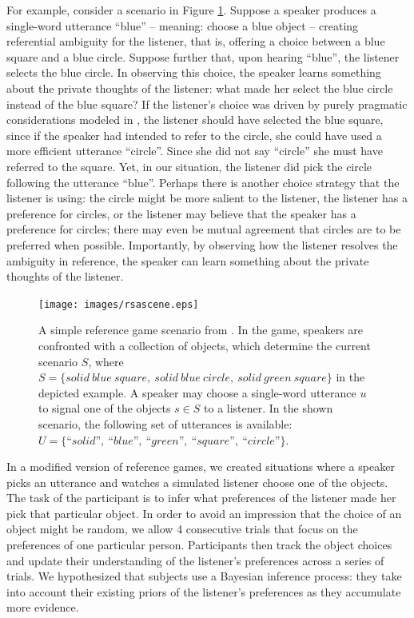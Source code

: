\documentclass[10pt,a4paper]{article}
\begin{document}
For example, consider a scenario in  Figure \ref{FG-ref-game}. Suppose a speaker produces a single-word utterance ``blue'' -- meaning: choose a blue object -- creating referential ambiguity for the listener, that is, offering a choice between a blue square and a blue circle. 
Suppose further that, upon hearing ``blue'', the listener selects the blue circle.
In observing this choice, the speaker learns something about the private thoughts of the listener: what made her select the blue circle instead of the blue square? If the listener's choice was driven by purely pragmatic considerations modeled in , the listener should have selected the blue square, since if the speaker had intended to refer to the circle, she could have used a more efficient utterance ``circle''. Since she did not say ``circle'' she must have referred to the square. Yet, in our situation, the listener did pick the circle following the utterance ``blue''. Perhaps there is another choice strategy that the listener is using: the circle might be more salient to the listener, the listener has a preference for circles, or the listener may believe that the speaker has a preference for circles; there may even be mutual agreement that circles are to be preferred when possible. Importantly, by observing how the listener resolves the ambiguity in reference, the speaker can learn something about the private thoughts of the listener.

\begin{figure}
	\centering
	\texttt{[image: images/rsascene.eps]}
	\caption{A simple reference game scenario from \protect{}.
		In the game, speakers are confronted with a collection of objects, which determine the current scenario $S$, where $S=\{solid\ blue\ square,\ solid\ blue\ circle,\ solid\ green\ square\}$ in the depicted example. 
		A speaker may choose a single-word utterance $u$ to signal one of the objects $s\in S$ to a listener.
		In the shown scenario, the following set of utterances is available: $U =\{\textit{``solid''},\ \textit{``blue''},\ \textit{``green''},\ \textit{``square''},\ \textit{``circle''}\}$.
	}
	\label{FG-ref-game}
\end{figure}


In a modified version of reference games, we created situations where a speaker picks an utterance and watches a simulated listener choose one of the objects.
The task of the participant is to infer what preferences of the listener made her pick that particular object.
In order to avoid an impression that the choice of an object might be random, we allow 4 consecutive trials that focus on the preferences of one particular person.
Participants then track the object choices and update their understanding of the listener's preferences across a series of trials. 
We hypothesized that subjects use a Bayesian inference process: they take into account their existing priors of the listener's preferences as they accumulate more evidence.
\end{document}
